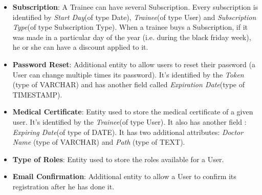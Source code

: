 \begin{itemize}
    	\item \textbf{Subscription}: A Trainee can have several Subscription. Every subscription is identified by \textit{Start Day}(of type Date), \textit{Trainee}(of type User) and \textit{Subscription Type}(of type Subscription Type). When a trainee buys a Subscription, if it was made in a particular day of the year (i.e. during the black friday week), he or she can have a discount applied to it.
    	
    	\item \textbf{Password Reset}: Additional entity to allow users to reset their password (a User can change multiple times its password). It's identified by the \textit{Token} (type of VARCHAR) and has another field called \textit{Expiration Date}(type of TIMESTAMP).
        
        \item \textbf{Medical Certificate}: Entity used to store the medical certificate of a given user. It's identified by the \textit{Trainee}(of type User). It also has another field : \textit{Expiring Date}(of type of DATE). It has two additional attributes: \textit{Doctor Name} (type of VARCHAR) and \textit{Path} (type of TEXT).
        
        \item \textbf{Type of Roles}: Entity used to store the roles available for a User.
        
        \item \textbf{Email Confirmation}: Additional entity to allow a User to confirm its registration after he has done it.
	
    \end{itemize}
